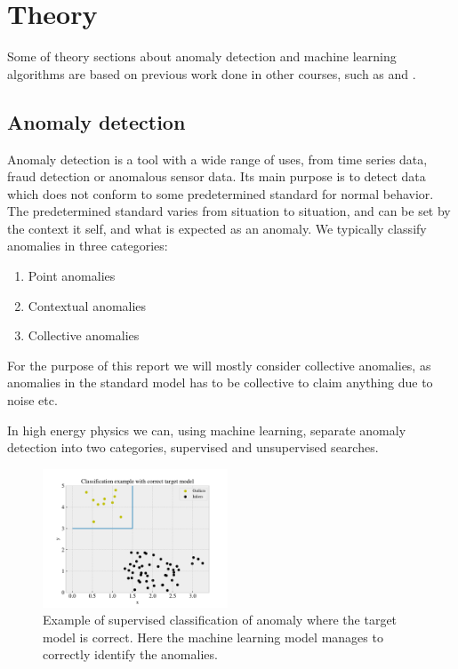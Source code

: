 \documentclass[ reprint, amsmath,amssymb, aps, nofootinbib]{revtex4-2}
\begin{document}
\section{Theory}
Some of theory sections about anomaly detection and machine learning algorithms are based on previous work done in other courses, such as \cite{FYSSTK} and \cite{ML_PROJ}.

\subsection{Anomaly detection}

Anomaly detection is a tool with a wide range of uses, from time series data, fraud detection or anomalous sensor data. Its main purpose is to detect data which does not conform to some predetermined standard for normal behavior. The predetermined standard varies from situation to situation, and can be set by the context it self, and what is expected as an anomaly. We typically classify anomalies in three categories\cite{anom_detec}:
\begin{enumerate}
    \item Point anomalies
    \item Contextual anomalies
    \item Collective anomalies
\end{enumerate}

For the purpose of this report we will mostly consider collective anomalies, as anomalies in the standard model has to be collective to claim anything due to noise etc. \par 

In high energy physics we can, using machine learning, separate anomaly detection into two categories, supervised and unsupervised searches. 

\begin{figure}[H]
    \centering
    \includegraphics[width=0.49\textwidth]{figures/theory/correct_class.pdf}
    \caption{Example of supervised classification of anomaly where the target model is correct. Here the machine learning model manages to correctly identify the anomalies. }
    \label{fig:corr_class}
\end{figure}
\end{document}
